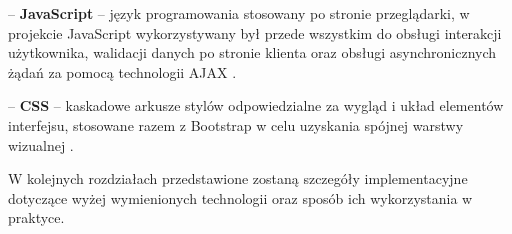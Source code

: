 – \textbf{JavaScript} – język programowania stosowany po stronie przeglądarki, w projekcie JavaScript wykorzystywany był przede wszystkim do obsługi interakcji użytkownika, walidacji danych po stronie klienta oraz obsługi asynchronicznych żądań za pomocą technologii AJAX \cite{javascript-docs}.

– \textbf{CSS} – kaskadowe arkusze stylów odpowiedzialne za wygląd i układ elementów interfejsu, stosowane razem z Bootstrap w celu uzyskania spójnej warstwy wizualnej \cite{css-docs}.

W kolejnych rozdziałach przedstawione zostaną szczegóły implementacyjne dotyczące wyżej wymienionych technologii oraz sposób ich wykorzystania w praktyce.






